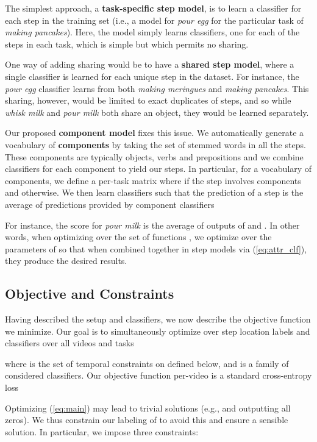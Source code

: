 \documentclass[10pt,twocolumn,letterpaper]{article}
\begin{document}
The simplest approach, a {\bf task-specific step model}, is to learn a
classifier for each step in the training set (i.e., a model for {\it pour egg} for the
particular task of {\it making pancakes}). Here, the model simply learns
 classifiers, one for each of the  steps in each
task, which is simple but which permits no sharing.

One way of adding sharing would be to have a {\bf shared step model}, where a single
classifier is learned for each unique step in the dataset. For instance, the
{\it pour egg} classifier learns from both {\it making meringues} and {\it making
  pancakes}.
This sharing, however, would be limited to exact duplicates
of steps, and so while {\it whisk milk} and {\it pour milk} both share an object,
they would be learned separately.

Our proposed {\bf component model} fixes this issue. We automatically generate a vocabulary
of {\bf components} by taking the set of stemmed words in all the
steps. These components are typically objects, verbs and prepositions and we combine classifiers for each component to yield our steps.
In particular, for a vocabulary of  components, we
define a per-task matrix  where
 if the step  involves components  and  otherwise.
We then learn  classifiers  such that
the prediction of a step  is the average of predictions provided by component classifiers

For instance,
the score for {\it pour milk} is the average of outputs of 
and . In other words, when optimizing over the set
of functions , we optimize over the parameters of  so that
when combined together in step models via (\ref{eq:attr_clf}), they produce
the desired results.

\subsection{Objective and Constraints}
\label{subsec:constraints}

Having described the setup and classifiers, we now describe the objective
function we minimize. Our goal is to simultaneously optimize over step location
labels  and classifiers  over all videos and tasks

where  is the set of temporal constraints on  defined below, and
 is a family of considered classifiers. Our objective
function per-video is a standard cross-entropy loss


Optimizing (\ref{eq:main}) may lead to trivial solutions (e.g.,  and
 outputting all zeros). We thus constrain our labeling of 
to avoid this and ensure a sensible solution. In particular, we
impose three constraints:
\end{document}
